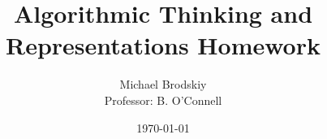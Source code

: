 


\title{Algorithmic Thinking and Representations Homework}
\date{\today}
\author{Michael Brodskiy\\ \small Professor: B. O'Connell}



\maketitle

\listoffigures

